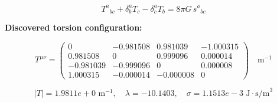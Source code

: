 
\begin{equation}
  T^a{}_{bc} + \delta^a_b T_c - \delta^a_c T_b = 8\pi G \, s^a{}_{bc}
\end{equation}

\textbf{Discovered torsion configuration:}

\begin{equation}
  T^{\mu\nu} = \begin{pmatrix}
    0 & -0.981508 & 0.981039 & -1.000315 \\
    0.981508 & 0 & 0.999096 & 0.000014 \\
    -0.981039 & -0.999096 & 0 & 0.000008 \\
    1.000315 & -0.000014 & -0.000008 & 0
  \end{pmatrix} \quad \text{m}^{-1}
\end{equation}

\begin{equation}
  |T| = 1.9811e+0 \text{ m}^{-1}, \quad
  \lambda = -10.1403, \quad
  \sigma = 1.1513e-3 \text{ J}\cdot\text{s/m}^3
\end{equation}